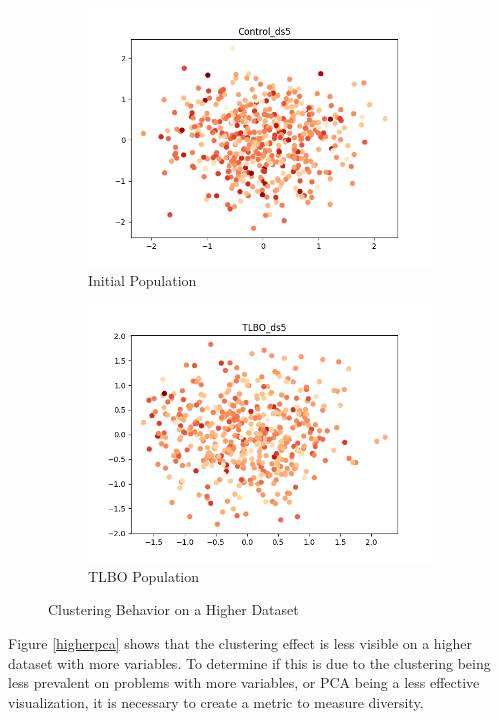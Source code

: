 \documentclass[11pt, letterpaper, onecolumn]{article}
\begin{document}
\begin{figure}[h!]\label{higherpca}
  \centering
  \begin{subfigure}[!h]{0.4\linewidth}
    \includegraphics[width=\linewidth]{graphs/Control_ds5__pca.png}
    \caption{Initial Population}
  \end{subfigure}
  \begin{subfigure}[!h]{0.4\linewidth}
    \includegraphics[width=\linewidth]{graphs/TLBO_ds5__pca.png}
    \caption{TLBO Population}
  \end{subfigure}
  \caption{Clustering Behavior on a Higher Dataset}
  \label{fig:coffee}
\end{figure}

Figure \ref{higherpca} shows that the clustering effect is less visible on a higher dataset with more variables. To determine if this is due to the clustering being less prevalent on problems with more variables, or PCA being a less effective visualization, it is necessary to create a metric to measure diversity. 
\end{document}
